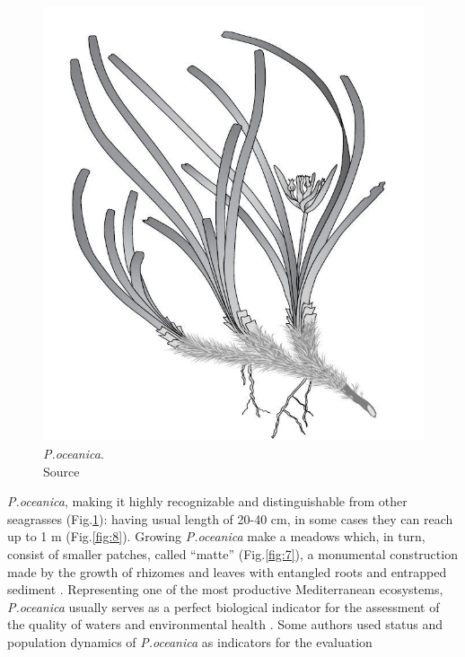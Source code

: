 \documentclass[10pt, a4paper]{article}
\begin{document}
\begin{figure}
	\centering
	\includegraphics[scale=0.15]{Fig-1-6.jpg}
	\caption{\textit{P.oceanica}.\\
	Source \cite{Luque04}\label{Luque04}}
	\label{fig:6}
\end{figure}

\textit{P.oceanica}, making it highly recognizable and distinguishable from other seagrasses (Fig.\ref{fig:6}): having
usual length of 20-40 cm, in some cases they can reach up to 1 m \cite{Borum04}\label{Borum04}  (Fig.\ref{fig:8}).
Growing \textit{P.oceanica} make a meadows which, in turn, consist of smaller patches, called “matte”
(Fig.\ref{fig:7}), a monumental construction made by the growth of rhizomes and leaves with entangled roots
and entrapped sediment \cite{Francour06}\label{Francour06}.
Representing one of the most productive Mediterranean ecosystems, \textit{P.oceanica} usually serves as a
perfect biological indicator for the assessment of the quality of waters and environmental health
\cite{Boudouresque89}\label{Boudouresque89}. Some authors \cite{Guidetti08,Montefalcone09}\label{Guidetti08} \label{Montefalcone09} used status and population dynamics of \textit{P.oceanica} as indicators for the evaluation
\end{document}
